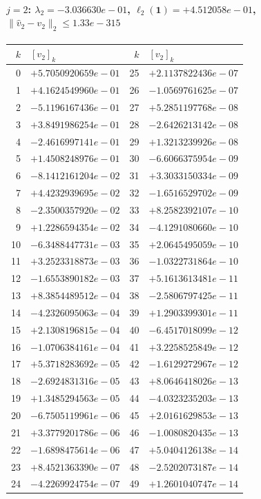 \paragraph{$j = 2$: $\lambda_{2} = -3.036630e-01$, \quad $\ell_{2}(\mathbf{1}) = +4.512058e-01$, \quad $\|\hat{v}_{2} - v_{2}\|_2 \leq 1.33e-315$}
\begin{center}
{\footnotesize
\begin{tabular}{r@{\;\;}l@{\quad}r@{\;\;}l}
\toprule
$k$ & $[v_{2}]_k$ & $k$ & $[v_{2}]_k$ \\
\midrule
0 & $+5.7050920659e-01$ & 25 & $+2.1137822436e-07$ \\
1 & $+4.1624549960e-01$ & 26 & $-1.0569761625e-07$ \\
2 & $-5.1196167436e-01$ & 27 & $+5.2851197768e-08$ \\
3 & $+3.8491986254e-01$ & 28 & $-2.6426213142e-08$ \\
4 & $-2.4616997141e-01$ & 29 & $+1.3213239926e-08$ \\
5 & $+1.4508248976e-01$ & 30 & $-6.6066375954e-09$ \\
6 & $-8.1412161204e-02$ & 31 & $+3.3033150334e-09$ \\
7 & $+4.4232939695e-02$ & 32 & $-1.6516529702e-09$ \\
8 & $-2.3500357920e-02$ & 33 & $+8.2582392107e-10$ \\
9 & $+1.2286594354e-02$ & 34 & $-4.1291080660e-10$ \\
10 & $-6.3488447731e-03$ & 35 & $+2.0645495059e-10$ \\
11 & $+3.2523318873e-03$ & 36 & $-1.0322731864e-10$ \\
12 & $-1.6553890182e-03$ & 37 & $+5.1613613481e-11$ \\
13 & $+8.3854489512e-04$ & 38 & $-2.5806797425e-11$ \\
14 & $-4.2326095063e-04$ & 39 & $+1.2903399301e-11$ \\
15 & $+2.1308196815e-04$ & 40 & $-6.4517018099e-12$ \\
16 & $-1.0706384161e-04$ & 41 & $+3.2258525849e-12$ \\
17 & $+5.3718283692e-05$ & 42 & $-1.6129272967e-12$ \\
18 & $-2.6924831316e-05$ & 43 & $+8.0646418026e-13$ \\
19 & $+1.3485294563e-05$ & 44 & $-4.0323235203e-13$ \\
20 & $-6.7505119961e-06$ & 45 & $+2.0161629853e-13$ \\
21 & $+3.3779201786e-06$ & 46 & $-1.0080820435e-13$ \\
22 & $-1.6898475614e-06$ & 47 & $+5.0404126138e-14$ \\
23 & $+8.4521363390e-07$ & 48 & $-2.5202073187e-14$ \\
24 & $-4.2269924754e-07$ & 49 & $+1.2601040747e-14$ \\
\bottomrule
\end{tabular}
}
\end{center}

